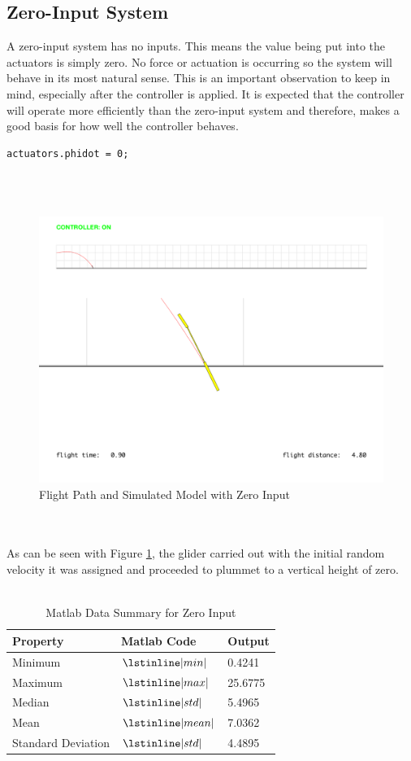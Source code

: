 \documentclass[12pt]{article}
\begin{document}
\subsection{Zero-Input System}
A zero-input system has no inputs. This means the value being put into the actuators is simply zero. No force or actuation is occurring so the system will behave in its most natural sense. This is an important observation to keep in mind, especially after the controller is applied. It is expected that the controller will operate more efficiently than the zero-input system and therefore, makes a good basis for how well the controller behaves. 
\\
\begin{lstlisting}[frame=single]
actuators.phidot = 0;
\end{lstlisting}
\\ \\ 
\begin{figure}[H]
\includegraphics[width=1\textwidth]{zeroinput.pdf}
\centering
\caption{Flight Path and Simulated Model with Zero Input}
\label{zi}
\end{figure} 
\\ \\
As can be seen with Figure \ref{zi}, the glider carried out with the initial random velocity it was assigned and proceeded to plummet to a vertical height of zero.
\\ \\
\begin{table}[H]
\centering
\begin{tabular}{|p{4cm}|p{4cm}|p{4cm}|}
\hline
Property & Matlab Code & Output \\
\hline \hline
Minimum  & $\lstinline|min|$ & 0.4241\\
Maximum &   $\lstinline|max|$ & 25.6775\\
Median & $\lstinline|std|$ & 5.4965\\ 
Mean    & $\lstinline|mean|$ & 7.0362\\ 
Standard Deviation &   $\lstinline|std|$  & 4.4895\\
\hline
\end{tabular}
\caption{Matlab Data Summary for Zero Input\label{zeroTable}}
\end{table}
\end{document}
